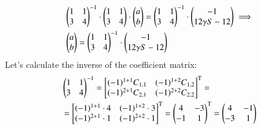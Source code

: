 \begin{align*}
&
\begin{pmatrix}
1 & 1 \\
3 & 4
\end{pmatrix}^{-1}
\cdot
\begin{pmatrix}
1 & 1 \\
3 & 4
\end{pmatrix}
\cdot
\begin{pmatrix}
a \\
b
\end{pmatrix}
=
\begin{pmatrix}
1 & 1 \\
3 & 4
\end{pmatrix}^{-1}
\cdot
\begin{pmatrix}
-1 \\
12 \gamma S - 12
\end{pmatrix}
\implies \notag\\
&\begin{pmatrix}
a \\
b
\end{pmatrix}
=
\begin{pmatrix}
1 & 1 \\
3 & 4
\end{pmatrix}^{-1}
\cdot
\begin{pmatrix}
-1 \\
12 \gamma S - 12
\end{pmatrix}
\end{align*}
Let's calculate the inverse of the coefficient matrix:
\begin{align*}
&
\begin{pmatrix}
1 & 1 \\
3 & 4
\end{pmatrix}^{-1}
=
\begin{bmatrix}
(-1)^{1+1}C_{1,1} & (-1)^{1+2}C_{1,2} \\
(-1)^{2+1}C_{2,1} & (-1)^{2+2}C_{2,2}
\end{bmatrix}^\text{T}
= \notag\\
&=\begin{bmatrix}
(-1)^{1+1} \cdot 4 & (-1)^{1+2} \cdot 3 \\
(-1)^{2+1} \cdot 1 & (-1)^{2+2} \cdot 1
\end{bmatrix}^\text{T}
=
\begin{pmatrix}
4 & -3 \\
-1 & 1
\end{pmatrix}^\text{T}
=
\begin{pmatrix}
4 & -1 \\
-3 & 1
\end{pmatrix}
\end{align*}
